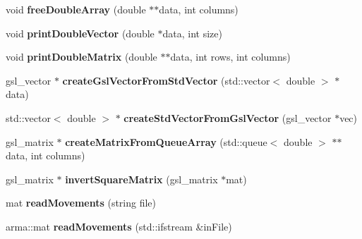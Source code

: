 \begin{DoxyCompactItemize}
\item 
\hypertarget{namespacekukadu_a2355ace0f2bbc7fe4dbd6c6b6b8ffe15}{void {\bfseries free\-Double\-Array} (double $\ast$$\ast$data, int columns)}\label{namespacekukadu_a2355ace0f2bbc7fe4dbd6c6b6b8ffe15}

\item 
\hypertarget{namespacekukadu_afceb599567dbb0584930fa93bb15c1b3}{void {\bfseries print\-Double\-Vector} (double $\ast$data, int size)}\label{namespacekukadu_afceb599567dbb0584930fa93bb15c1b3}

\item 
\hypertarget{namespacekukadu_a381c3ceb132b6c994ca9f588a1f9d346}{void {\bfseries print\-Double\-Matrix} (double $\ast$$\ast$data, int rows, int columns)}\label{namespacekukadu_a381c3ceb132b6c994ca9f588a1f9d346}

\item 
\hypertarget{namespacekukadu_a3166b4ad3fa7342f892e90b01ea725ff}{gsl\-\_\-vector $\ast$ {\bfseries create\-Gsl\-Vector\-From\-Std\-Vector} (std\-::vector$<$ double $>$ $\ast$data)}\label{namespacekukadu_a3166b4ad3fa7342f892e90b01ea725ff}

\item 
\hypertarget{namespacekukadu_a7e023bd38f66ef8b53bdbf70558d3053}{std\-::vector$<$ double $>$ $\ast$ {\bfseries create\-Std\-Vector\-From\-Gsl\-Vector} (gsl\-\_\-vector $\ast$vec)}\label{namespacekukadu_a7e023bd38f66ef8b53bdbf70558d3053}

\item 
\hypertarget{namespacekukadu_a0349839959bc23cc4ac3aa4f4fa2bd8d}{gsl\-\_\-matrix $\ast$ {\bfseries create\-Matrix\-From\-Queue\-Array} (std\-::queue$<$ double $>$ $\ast$$\ast$data, int columns)}\label{namespacekukadu_a0349839959bc23cc4ac3aa4f4fa2bd8d}

\item 
\hypertarget{namespacekukadu_a26d727537843251062a70a7a4ec9939d}{gsl\-\_\-matrix $\ast$ {\bfseries invert\-Square\-Matrix} (gsl\-\_\-matrix $\ast$mat)}\label{namespacekukadu_a26d727537843251062a70a7a4ec9939d}

\item 
\hypertarget{namespacekukadu_a9053e606ebc51864872868167de10d72}{mat {\bfseries read\-Movements} (string file)}\label{namespacekukadu_a9053e606ebc51864872868167de10d72}

\item 
\hypertarget{namespacekukadu_afb5618752910f4be56f93f778e323db9}{arma\-::mat {\bfseries read\-Movements} (std\-::ifstream \&in\-File)}\label{namespacekukadu_afb5618752910f4be56f93f778e323db9}


\end{DoxyCompactItemize}
